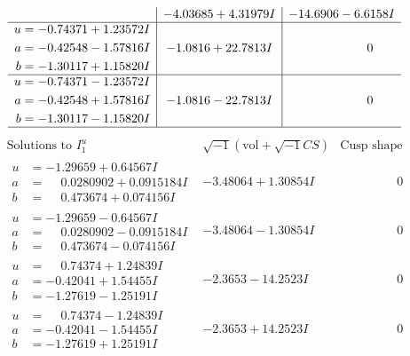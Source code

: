 \documentclass[1p]{elsarticle_modified}
\theoremstyle{definition}
\newcommand{\I}{\sqrt{-1}}
\begin{document}
$$\begin{array}{c|c|c}
 & -4.03685 + 4.31979 I & -14.6906 - 6.6158 I \\ \hline\begin{aligned}
u &= -0.74371 + 1.23572 I \\
a &= -0.42548 - 1.57816 I \\
b &= -1.30117 + 1.15820 I\end{aligned}
 & -1.0816 + 22.7813 I & \phantom{-0.000000 } 0 \\ \hline\begin{aligned}
u &= -0.74371 - 1.23572 I \\
a &= -0.42548 + 1.57816 I \\
b &= -1.30117 - 1.15820 I\end{aligned}
 & -1.0816 - 22.7813 I & \phantom{-0.000000 } 0\\
 \hline 
 \end{array}$$\newpage$$\begin{array}{c|c|c}  
\text{Solutions to }I^u_{1}& \I (\text{vol} + \sqrt{-1}CS) & \text{Cusp shape}\\
 \hline 
\begin{aligned}
u &= -1.29659 + 0.64567 I \\
a &= \phantom{-}0.0280902 + 0.0915184 I \\
b &= \phantom{-}0.473674 + 0.074156 I\end{aligned}
 & -3.48064 + 1.30854 I & \phantom{-0.000000 } 0 \\ \hline\begin{aligned}
u &= -1.29659 - 0.64567 I \\
a &= \phantom{-}0.0280902 - 0.0915184 I \\
b &= \phantom{-}0.473674 - 0.074156 I\end{aligned}
 & -3.48064 - 1.30854 I & \phantom{-0.000000 } 0 \\ \hline\begin{aligned}
u &= \phantom{-}0.74374 + 1.24839 I \\
a &= -0.42041 + 1.54455 I \\
b &= -1.27619 - 1.25191 I\end{aligned}
 & -2.3653 - 14.2523 I & \phantom{-0.000000 } 0 \\ \hline\begin{aligned}
u &= \phantom{-}0.74374 - 1.24839 I \\
a &= -0.42041 - 1.54455 I \\
b &= -1.27619 + 1.25191 I\end{aligned}
 & -2.3653 + 14.2523 I & \phantom{-0.000000 } 0 \\ \hline\begin{aligned}

\end{aligned}
\end{array}$$
\end{document}
